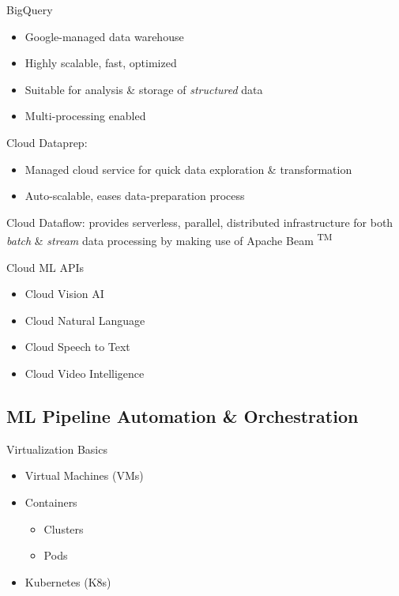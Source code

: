 \documentclass[10pt,landscape,letterpaper]{cheatsheet}
\begin{document}
\begin{multicols}{3}

BigQuery

\begin{itemize}
    \item Google-managed data warehouse
    \item Highly scalable, fast, optimized
    \item Suitable for analysis \& storage of \textit{structured} data
    \item Multi-processing enabled
\end{itemize}

Cloud Dataprep: 

\begin{itemize}
    \item Managed cloud service for quick data exploration \& transformation
    \item Auto-scalable, eases data-preparation process
\end{itemize}

Cloud Dataflow: provides serverless, parallel, distributed infrastructure for both \emph{batch} \& \emph{stream} data processing by making use of Apache Beam \textsuperscript{TM}

Cloud ML APIs

\begin{itemize}
    \item Cloud Vision AI
    \item Cloud Natural Language
    \item Cloud Speech to Text
    \item Cloud Video Intelligence
\end{itemize}

\subsection{ML Pipeline Automation \& Orchestration}

Virtualization Basics

\begin{itemize}
    \item Virtual Machines (VMs)
    \item Containers
    \begin{itemize}
        \item Clusters
        \item Pods
    \end{itemize}
    \item Kubernetes (K8s)
\end{itemize}


\end{multicols}
\end{document}
